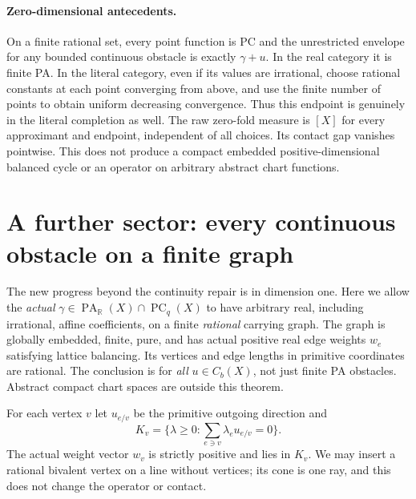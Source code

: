 \documentclass[11pt]{article}
\newcommand{\R}{\mathbb R}
\newcommand{\PC}{\operatorname{PC}}
\newcommand{\PA}{\operatorname{PA}}
\begin{document}
\paragraph{Zero-dimensional antecedents.}
On a finite rational set, every point function is PC and the unrestricted
envelope for any bounded continuous obstacle is exactly $\gamma+u$.
In the real category it is finite PA. In the literal category, even if
its values are irrational, choose rational constants at each point
converging from above, and use the finite number of points to obtain
uniform decreasing convergence. Thus this endpoint is genuinely in the
literal completion as well. The raw zero-fold measure is $[X]$ for
every approximant and endpoint, independent of all choices. Its contact
gap vanishes pointwise. This does not produce a compact embedded
positive-dimensional balanced cycle or an operator on arbitrary abstract
chart functions.

\section{A further sector: every continuous obstacle on a finite graph}\label{graph-sector}
The new progress beyond the continuity repair is in dimension one. Here
we allow the \emph{actual} $\gamma\in\PA_\R(X)\cap\PC_q(X)$ to have
arbitrary real, including irrational, affine coefficients, on a finite
\emph{rational} carrying graph. The graph is globally embedded, finite,
pure, and has actual positive real edge weights $w_e$ satisfying lattice
balancing. Its vertices and edge lengths in primitive coordinates are
rational. The conclusion is for \emph{all} $u\in C_b(X)$, not just finite
PA obstacles. Abstract compact chart spaces are outside this theorem.

For each vertex $v$ let $u_{e/v}$ be the primitive outgoing direction and
\[
 K_v=\{\lambda\geq0:\sum_{e\ni v}\lambda_eu_{e/v}=0\}.
\]
The actual weight vector $w_v$ is strictly positive and lies in $K_v$.
We may insert a rational bivalent vertex on a line without vertices;
its cone is one ray, and this does not change the operator or contact.
\end{document}
